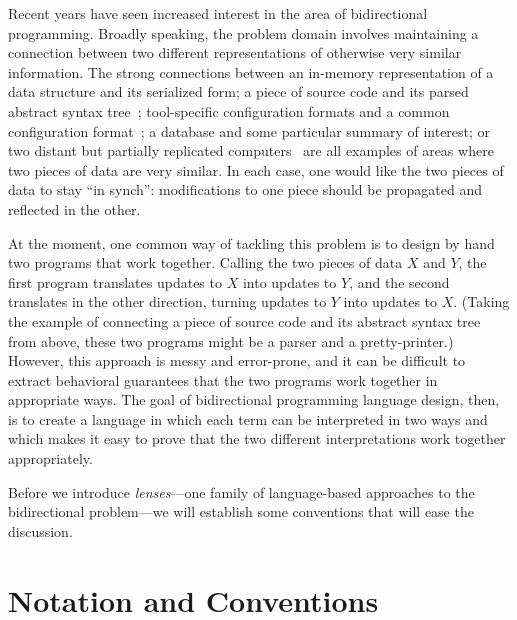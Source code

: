 Recent years have seen increased interest in the area of bidirectional
programming. Broadly speaking, the problem domain involves maintaining a
connection between two different representations of otherwise very similar
information. The strong connections between an in-memory representation of a
data structure and its serialized form; a piece of source code and its
parsed abstract syntax tree~\cite{rendel2010invertible}; tool-specific
configuration formats and a common configuration format~\cite{Augeas}; a
database and some particular summary of interest; or two distant but
partially replicated computers~\cite{pierce2004unison} are all examples of
areas where two pieces of data are very similar. In each case, one would
like the two pieces of data to stay ``in synch'': modifications to one piece
should be propagated and reflected in the other.

At the moment, one common way of tackling this problem is to design by hand
two programs that work together. Calling the two pieces of data $X$ and $Y$,
the first program translates updates to $X$ into updates to $Y$, and the
second translates in the other direction, turning updates to $Y$ into
updates to $X$. (Taking the example of connecting a piece of source code and
its abstract syntax tree from above, these two programs might be a parser
and a pretty-printer.) However, this approach is messy and error-prone, and
it can be difficult to extract behavioral guarantees that the two programs
work together in appropriate ways. The goal of bidirectional programming
language design, then, is to create a language in which each term can be
interpreted in two ways and which makes it easy to prove that the two
different interpretations work together appropriately.

Before we introduce \emph{lenses}---one family of language-based approaches
to the bidirectional problem---we will establish some conventions that will
ease the discussion.

\section{Notation and Conventions}
